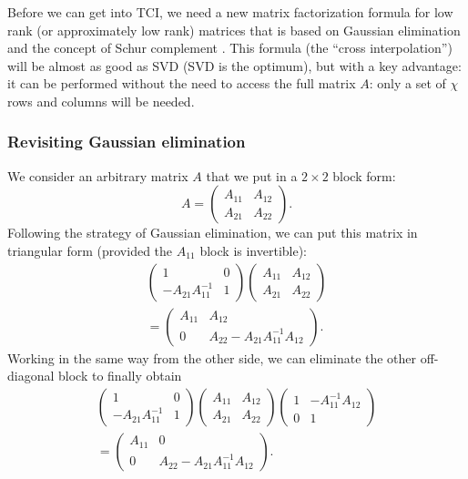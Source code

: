 \documentclass{SciPost}
\begin{document}
Before we can get into TCI, we need a new matrix factorization formula for low rank
(or approximately low rank) matrices that is based on Gaussian elimination and the concept of
Schur complement \cite{golub1996}. This formula (the ``cross interpolation'') will be almost as good as SVD (SVD is the optimum), but with a key advantage: it can be performed without the need to access the full matrix $A$: only a set of $\chi$ rows and columns will be needed.

\subsubsection{Revisiting Gaussian elimination}
We consider an arbitrary matrix $A$ that we put in a $2\times 2$ block form:
\begin{equation}
A =
\begin{pmatrix}
A_{11} & A_{12} \\
A_{21} & A_{22}
\end{pmatrix}.
\end{equation}
Following the strategy of Gaussian elimination, we can put this matrix in triangular form (provided the $A_{11}$ block is invertible):
\begin{eqnarray}
\begin{pmatrix}
1 & 0 \\
- A_{21} A_{11}^{-1} & 1
\end{pmatrix}
\begin{pmatrix}
A_{11} & A_{12} \\
A_{21} & A_{22}
\end{pmatrix}
 \nonumber \\
=
\begin{pmatrix}
A_{11} & A_{12} \\
0 & A_{22} - A_{21}A_{11}^{-1} A_{12}
\end{pmatrix}.
\end{eqnarray}
Working in the same way from the other side, we can eliminate the other off-diagonal block to finally obtain
\begin{eqnarray}
\begin{pmatrix}
1 & 0 \\
- A_{21} A_{11}^{-1} & 1
\end{pmatrix}
\begin{pmatrix}
A_{11} & A_{12} \\
A_{21} & A_{22}
\end{pmatrix}
\begin{pmatrix}
1 & -A_{11}^{-1} A_{12} \\
0 & 1
\end{pmatrix} \nonumber \\
=
\begin{pmatrix}
A_{11} & 0 \\
0 & A_{22} - A_{21}A_{11}^{-1} A_{12}
\end{pmatrix}.
\end{eqnarray}
\end{document}
